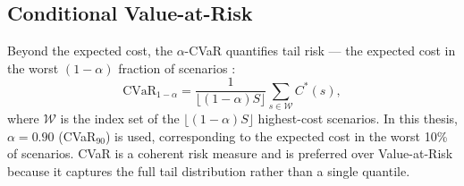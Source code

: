 \subsection{Conditional Value-at-Risk}

Beyond the expected cost, the $\alpha$-CVaR quantifies tail risk --- the expected cost in the worst $(1-\alpha)$ fraction of scenarios \cite{rockafellar2000cvar}:
\begin{equation}
    \text{CVaR}_{1-\alpha} = \frac{1}{\lfloor (1-\alpha) S \rfloor} \sum_{s \in \mathcal{W}} C^*(s),
    \label{eq:cvar}
\end{equation}
where $\mathcal{W}$ is the index set of the $\lfloor (1-\alpha)S \rfloor$ highest-cost scenarios. In this thesis, $\alpha = 0.90$ (CVaR$_{90}$) is used, corresponding to the expected cost in the worst 10\% of scenarios. CVaR is a coherent risk measure \cite{rockafellar2000cvar} and is preferred over Value-at-Risk because it captures the full tail distribution rather than a single quantile.
